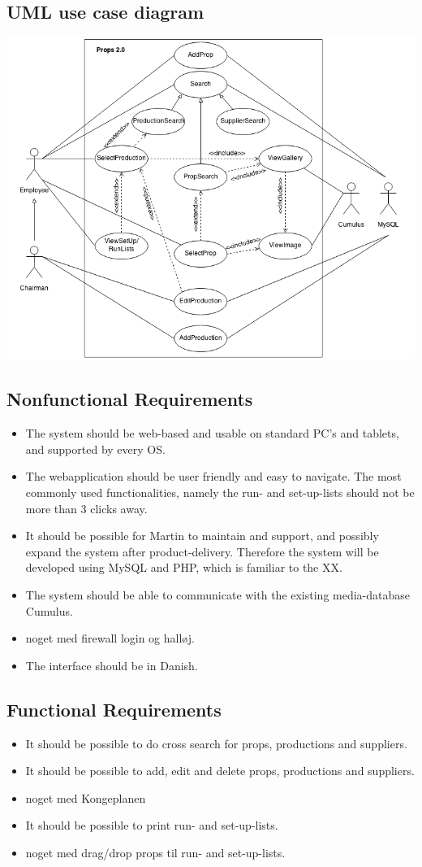 \documentclass[12pt]{article}
\begin{document}
\subsection{UML use case diagram}
\includegraphics[scale=0.6]{use.png}
\subsection{Nonfunctional Requirements}
\begin{itemize}
  \item The system should be web-based and usable on standard PC's and tablets, and supported by every OS.
  \item The webapplication should be user friendly and easy to navigate. The most commonly used functionalities, namely the run- and set-up-lists should not be more than 3 clicks away.
  \item It should be possible for Martin to maintain and support, and possibly expand the system after product-delivery. Therefore the system will be developed using MySQL and PHP, which is familiar to the XX.
  \item The system should be able to communicate with the existing media-database Cumulus.
  \item noget med firewall login og halløj.
  \item The interface should be in Danish.
\end{itemize}
\subsection{Functional Requirements}
\begin{itemize}
  \item It should be possible to do cross search for props, productions and suppliers.
  \item It should be possible to add, edit and delete props, productions and suppliers.
  \item noget med Kongeplanen
  \item It should be possible to print run- and set-up-lists.
  \item noget med drag/drop props til run- and set-up-lists.
\end{itemize}
\end{document}
